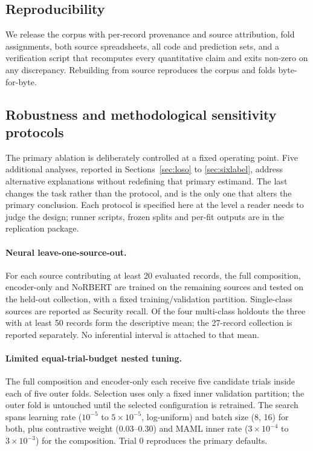 \documentclass[11pt,a4paper]{article}
\begin{document}
\subsection{Reproducibility}
\label{sec:reproducibility}

We release the corpus with per-record provenance and source attribution, fold assignments,
both source spreadsheets, all code and prediction sets, and a verification script that
recomputes every quantitative claim and exits non-zero on any discrepancy. Rebuilding from
source reproduces the corpus and folds byte-for-byte.

\subsection{Robustness and methodological sensitivity protocols}
\label{sec:protocols}

The primary ablation is deliberately controlled at a fixed operating point. Five additional analyses,
reported in Sections~\ref{sec:loso} to \ref{sec:sixlabel}, address alternative explanations without
redefining that primary estimand. The last changes the task rather than the protocol, and is the only one
that alters the primary conclusion. Each protocol is specified here at the level a reader needs to judge
the design; runner scripts, frozen splits and per-fit outputs are in the replication package.

\paragraph{Neural leave-one-source-out.} For each source contributing at least 20 evaluated records, the
full composition, encoder-only and NoRBERT are trained on the remaining sources and tested on the held-out
collection, with a fixed training/validation partition. Single-class sources are reported as Security
recall. Of the four multi-class holdouts the three with at least 50 records form the descriptive mean; the
27-record collection is reported separately. No inferential interval is attached to that mean.

\paragraph{Limited equal-trial-budget nested tuning.} The full composition and encoder-only each receive
five candidate trials inside each of five outer folds. Selection uses only a fixed inner validation
partition; the outer fold is untouched until the selected configuration is retrained. The search spans
learning rate ($10^{-5}$ to $5\times10^{-5}$, log-uniform) and batch size (8, 16) for both, plus
contrastive weight (0.03--0.30) and MAML inner rate ($3\times10^{-4}$ to $3\times10^{-3}$) for the
composition. Trial 0 reproduces the primary defaults.
\end{document}
